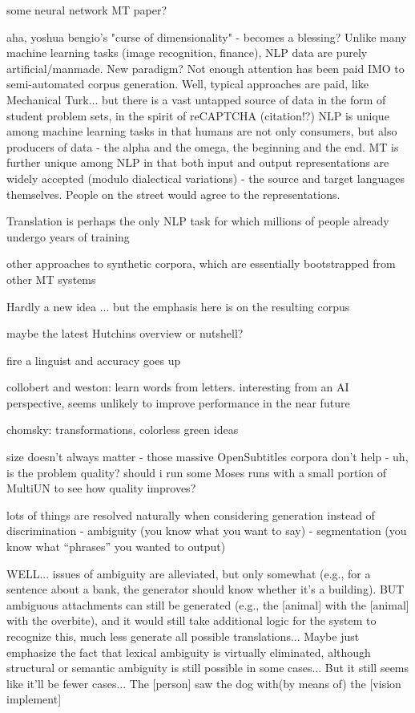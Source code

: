 some neural network MT paper?

aha, yoshua bengio's "curse of dimensionality" - becomes a blessing?  
Unlike many machine learning tasks (image recognition, finance), NLP data are purely artificial/manmade.  New paradigm?  Not enough attention has been paid IMO to semi-automated corpus generation.  Well, typical approaches are paid, like Mechanical Turk... but there is a vast untapped source of data in the form of student problem sets, in the spirit of reCAPTCHA (citation!?)
NLP is unique among machine learning tasks in that humans are not only consumers, but also producers of data - the alpha and the omega, the beginning and the end.
MT is further unique among NLP in that both input and output representations are widely accepted (modulo dialectical variations) - the source and target languages themselves.
People on the street would agree to the representations.


Translation is perhaps the only NLP task for which millions of people already undergo years of training

other approaches to synthetic corpora, which are essentially bootstrapped from other MT systems

Hardly a new idea ... but the emphasis here is on the resulting corpus




maybe the latest Hutchins overview or nutshell?

fire a linguist and accuracy goes up

collobert and weston: learn words from letters. interesting from an AI perspective, seems unlikely to improve performance in the near future

chomsky: transformations, colorless green ideas


size doesn't always matter - those massive OpenSubtitles corpora don't help
- uh, is the problem quality? should i run some Moses runs with a small portion of MultiUN to see how quality improves?

lots of things are resolved naturally when considering generation instead of discrimination
- ambiguity (you know what you want to say)
- segmentation (you know what ``phrases'' you wanted to output)

WELL... issues of ambiguity are alleviated, but only somewhat (e.g., for a sentence about a bank, the generator should know whether it's a building). 
BUT ambiguous attachments can still be generated (e.g., the [animal] with the [animal] with the overbite), and it would still take additional logic for the system to recognize this, much less generate all possible translations...
Maybe just emphasize the fact that lexical ambiguity is virtually eliminated, although structural or semantic ambiguity is still possible in some cases...
But it still seems like it'll be fewer cases... The [person] saw the dog with(by means of) the [vision implement]


